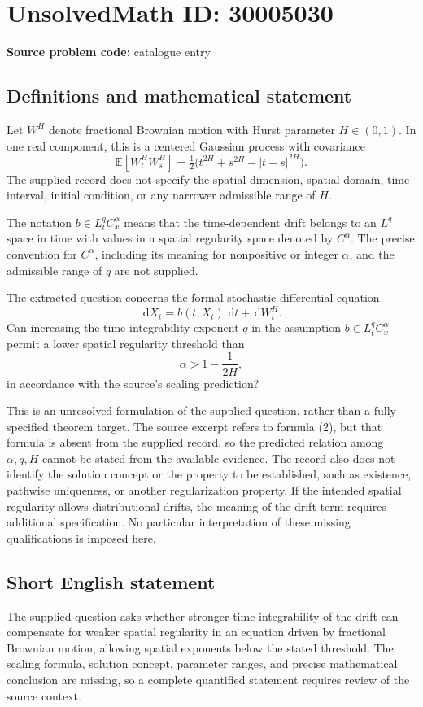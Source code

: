 \documentclass[11pt]{article}
\newcommand{\dd}{\,\mathrm{d}}
\begin{document}
\section*{UnsolvedMath ID: 30005030}
\textbf{Source problem code:} catalogue entry
\subsection{Definitions and mathematical statement}
Let \(W^H\) denote fractional Brownian motion with Hurst parameter \(H\in(0,1)\). In one real component, this is a centered Gaussian process with covariance
\[
\mathbb E[W_t^H W_s^H]=\tfrac12\bigl(t^{2H}+s^{2H}-|t-s|^{2H}\bigr).
\]
The supplied record does not specify the spatial dimension, spatial domain, time interval, initial condition, or any narrower admissible range of \(H\).

The notation \(b\in L_t^q C_x^\alpha\) means that the time-dependent drift belongs to an \(L^q\) space in time with values in a spatial regularity space denoted by \(C^\alpha\). The precise convention for \(C^\alpha\), including its meaning for nonpositive or integer \(\alpha\), and the admissible range of \(q\) are not supplied.

The extracted question concerns the formal stochastic differential equation
\[
\dd X_t=b(t,X_t)\,\dd t+\dd W_t^H.
\]
Can increasing the time integrability exponent \(q\) in the assumption \(b\in L_t^q C_x^\alpha\) permit a lower spatial regularity threshold than
\[
\alpha>1-\frac{1}{2H},
\]
in accordance with the source's scaling prediction?

This is an unresolved formulation of the supplied question, rather than a fully specified theorem target. The source excerpt refers to formula (2), but that formula is absent from the supplied record, so the predicted relation among \(\alpha,q,H\) cannot be stated from the available evidence. The record also does not identify the solution concept or the property to be established, such as existence, pathwise uniqueness, or another regularization property. If the intended spatial regularity allows distributional drifts, the meaning of the drift term requires additional specification. No particular interpretation of these missing qualifications is imposed here.
\subsection{Short English statement}
The supplied question asks whether stronger time integrability of the drift can compensate for weaker spatial regularity in an equation driven by fractional Brownian motion, allowing spatial exponents below the stated threshold. The scaling formula, solution concept, parameter ranges, and precise mathematical conclusion are missing, so a complete quantified statement requires review of the source context.
\end{document}
